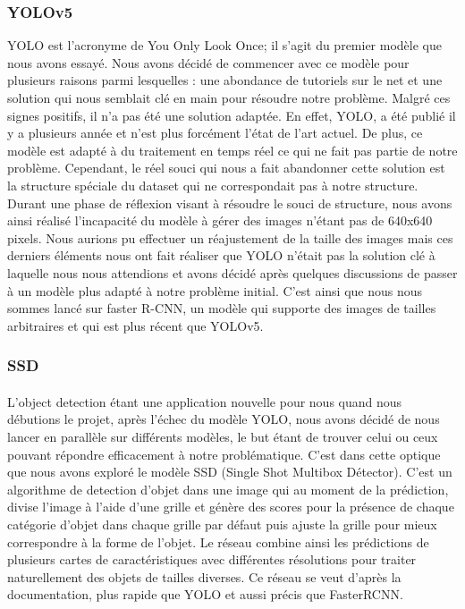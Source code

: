 \subsubsection{YOLOv5}
YOLO est l'acronyme de You Only Look Once; il s'agit du premier modèle que nous avons essayé. Nous avons décidé de commencer avec ce modèle pour plusieurs raisons parmi lesquelles : une abondance de tutoriels sur le net et une solution qui nous semblait clé en main pour résoudre notre problème. Malgré ces signes positifs, il n’a pas été une solution adaptée. \newline
En effet, YOLO, a été publié il y a plusieurs année et n’est plus forcément l’état de l’art actuel. De plus, ce modèle est adapté à du traitement en temps réel ce qui ne fait pas partie de notre problème. Cependant, le réel souci qui nous a fait abandonner cette solution est la structure spéciale du dataset qui ne correspondait pas à notre structure. \newline 
Durant une phase de réflexion visant à résoudre le souci de structure, nous avons ainsi réalisé l’incapacité du modèle à gérer des images n’étant pas de 640x640 pixels. Nous aurions pu effectuer un réajustement de la taille des images mais ces derniers éléments nous ont fait réaliser que YOLO n’était pas la solution clé à laquelle nous nous attendions et avons décidé après quelques discussions de passer à un modèle plus adapté à notre problème initial. C'est ainsi que nous nous sommes lancé sur faster R-CNN, un modèle qui supporte des images de tailles arbitraires et qui est plus récent que YOLOv5.

\subsubsection{SSD}
\paragraph{} L'object detection étant une application nouvelle pour nous quand nous débutions le projet, après l'échec du modèle YOLO, nous avons décidé de nous lancer en parallèle sur différents modèles, le but étant de trouver celui ou ceux pouvant répondre efficacement à notre problématique. C'est dans cette optique que nous avons exploré le modèle SSD (Single Shot Multibox Détector). C'est un algorithme de detection d'objet dans une image qui au moment de la prédiction, divise l’image à l’aide d’une grille et génère des scores pour la présence de chaque catégorie d'objet dans chaque grille par défaut puis ajuste la grille pour mieux correspondre à la forme de l'objet. Le réseau combine ainsi les prédictions de plusieurs cartes de caractéristiques avec différentes résolutions pour traiter naturellement des objets de tailles diverses. Ce réseau se veut d'après la documentation, plus rapide que YOLO et aussi précis que FasterRCNN. 
